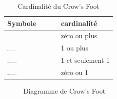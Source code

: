 \begin{table}[H]
\begin{center}
\begin{tabular}{ ll }
\hline Symbole & cardinalit\'e \\ \hline
\includegraphics[width=0.2\textwidth]{Figures/0+.png}
& z\'ero ou plus \\
\includegraphics[width=0.2\textwidth]{Figures/1+.png}
& 1 ou plus \\
\includegraphics[width=0.2\textwidth]{Figures/11.png}
& 1 et seulement 1 \\
\includegraphics[width=0.2\textwidth]{Figures/01.png}
& z\'ero ou 1
\end{tabular}
\caption{Cardinalit\'e du Crow's Foot}
\end{center}
\end{table}

\begin{figure}[H]
	\caption{\label{fig:my-label} Diagramme de Crow's Foot}
\end{figure}

